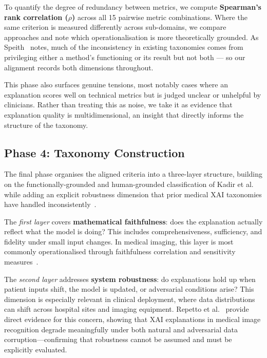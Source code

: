 To quantify the degree of redundancy between metrics, we compute
\textbf{Spearman's rank correlation ($\rho$)} across all 15 pairwise
metric combinations. Where the same criterion is measured differently
across sub-domains, we compare approaches and note which operationalisation
is more theoretically grounded. As Speith~\cite{speith2022review} notes,
much of the inconsistency in existing taxonomies comes from privileging
either a method's functioning or its result but not both --- so our
alignment records both dimensions throughout.

This phase also surfaces genuine tensions, most notably cases where an
explanation scores well on technical metrics but is judged unclear or
unhelpful by clinicians. Rather than treating this as noise, we take it
as evidence that explanation quality is multidimensional, an insight that
directly informs the structure of the taxonomy.

\subsection{Phase 4: Taxonomy Construction}

The final phase organises the aligned criteria into a three-layer
structure, building on the functionally-grounded and human-grounded
classification of Kadir et al.~\cite{kadir2023evaluation} while adding
an explicit robustness dimension that prior medical XAI taxonomies have
handled inconsistently~\cite{speith2022review, jin2023guidelines}.

The \emph{first layer} covers \textbf{mathematical faithfulness}: does
the explanation actually reflect what the model is doing? This includes
comprehensiveness, sufficiency, and fidelity under small input changes.
In medical imaging, this layer is most commonly operationalised through
faithfulness correlation and sensitivity
measures~\cite{kadir2023evaluation, jin2023guidelines}.

The \emph{second layer} addresses \textbf{system robustness}: do
explanations hold up when patient inputs shift, the model is updated, or
adversarial conditions arise? This dimension is especially relevant in
clinical deployment, where data distributions can shift across hospital
sites and imaging equipment. Repetto et al.~\cite{Repetto2025EvaluatingTR}
provide direct evidence for this concern, showing that XAI explanations in
medical image recognition degrade meaningfully under both natural and
adversarial data corruption---confirming that robustness cannot be assumed
and must be explicitly evaluated.

